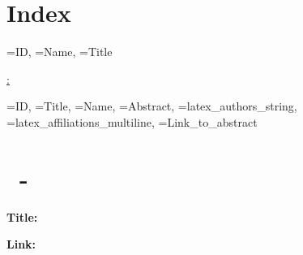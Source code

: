 \documentclass[a4paper,12pt]{article}
\begin{document}


\section*{Index}

\begin{itemize}
  {\ID=ID,
  \IndexName=Name,
  \IndexTitle=Title}
  {\item \textbf{\ID} \hyperref[abs:\ID]{\IndexName: \IndexTitle}}
\end{itemize}

\newpage

  {\ID=ID,
  \Title=Title, 
  \Name=Name, 
  \Abstract=Abstract, 
  \Authors=latex_authors_string, 
  \Affiliations=latex_affiliations_multiline,
  \URL=Link_to_abstract}
  {
    \section*{\ID\ - \Name}
    \label{abs:\ID}

    \textbf{Title:} \Title




    \textbf{Link:} \href{\URL}{\URL}

    \newpage
  }
\end{document}
